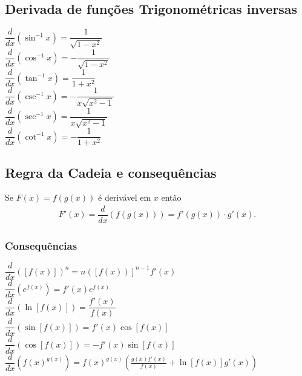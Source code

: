 \subsection*{Derivada de funções Trigonométricas inversas}
\begin{tcolorbox}
\begin{multicols}{3}
$\dfrac{d}{dx}\left(\sin^{-1}{x}\right)=\dfrac{1}{\sqrt{1-x^2}}$\\[0.5cm]
$\dfrac{d}{dx}\left(\cos^{-1}{x}\right)=-\dfrac{1}{\sqrt{1-x^2}}$\\[0.5cm]
$\dfrac{d}{dx}\left(\tan^{-1}{x}\right)=\dfrac{1}{1+ x^2}$\\[0.5cm]
$\dfrac{d}{dx}\left(\csc^{-1}{x}\right)=-\dfrac{1}{x\sqrt{x^2-1}}$\\[0.5cm]
$\dfrac{d}{dx}\left(\sec^{-1}{x}\right)=\dfrac{1}{x\sqrt{x^2-1}}$\\[0.5cm]
$\dfrac{d}{dx}\left(\cot^{-1}{x}\right)=-\dfrac{1}{1+x^2}$\\
\end{multicols}
\end{tcolorbox}

\subsection*{Regra da Cadeia e consequências}
\begin{tcolorbox}
\begin{teorema}
Se $F(x)=f(g(x))$ é derivável em $x$ então
\begin{align*}
    F'(x)=\dfrac{d}{dx}\left(f(g(x))\right)=f'(g(x))\cdot g'(x).
\end{align*}
\end{teorema}
\subsubsection*{Consequências}
\begin{multicols}{2}
$\dfrac{d}{dx}\left(\left[f(x)\right]\right)^n=n\left(\left[f(x)\right)\right]^{n-1}f'(x)$\\[0.5cm]
$\dfrac{d}{dx}\left(e^{f(x)}\right)=f'(x)e^{f(x)}$\\[0.5cm]
$\dfrac{d}{dx}\left(\ln\left[f(x)\right]\right)=\dfrac{f'(x)}{f(x)}$\\[0.5cm]
$\dfrac{d}{dx}\left(\sin\left[f(x)\right]\right)=f'(x)\cos\left[f(x)\right]$\\[0.5cm]
$\dfrac{d}{dx}\left(\cos\left[f(x)\right]\right)=-f'(x)\sin\left[f(x)\right]$\\[0.5cm]

$\dfrac{d}{dx}\left(f(x)^{g(x)}\right)= f(x)^{g(x)}\left( \frac{g(x)f'(x)}{f(x)}+\ln\left[f(x)\right]g'(x)\right)$\\
\end{multicols}
\end{tcolorbox}
